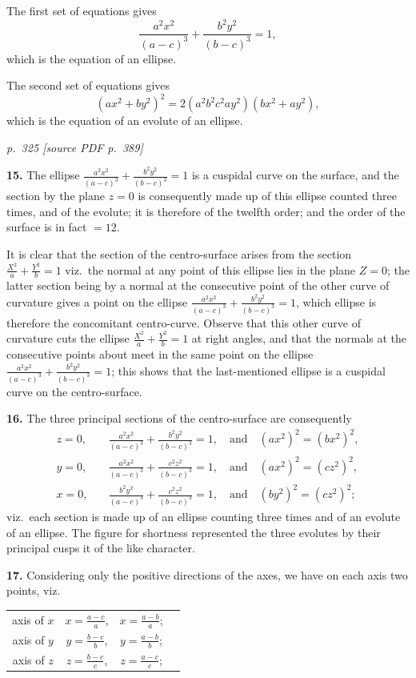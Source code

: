 \documentclass[11pt,a4paper]{article}
\newcommand{\pagemarker}[2]{\par\bigskip\noindent\textit{p.~#1 [source PDF p.~#2]}\par\smallskip}
\begin{document}
The first set of equations gives
\[
\frac{a^2 x^2}{(a - c)^3} + \frac{b^2 y^2}{(b - c)^3} = 1,
\]
which is the equation of an ellipse.

The second set of equations gives
\[
(a x^2 + b y^2)^2 = 2(a^2 b^2 c^2 a y^2)(b x^2 + a y^2),
\]
which is the equation of an evolute of an ellipse.

\clearpage

\pagemarker{325}{389}

\textbf{15.} The ellipse $\tfrac{a^2 x^2}{(a - c)^3} + \tfrac{b^2 y^2}{(b - c)^3} = 1$ is a cuspidal curve on the surface, and the section by the plane $z = 0$ is consequently made up of this ellipse counted three times, and of the evolute; it is therefore of the twelfth order; and the order of the surface is in fact $= 12$.

It is clear that the section of the centro-surface arises from the section $\tfrac{X^2}{a} + \tfrac{Y^2}{b} = 1$ viz.\ the normal at any point of this ellipse lies in the plane $Z = 0$; the latter section being by a normal at the consecutive point of the other curve of curvature gives a point on the ellipse $\tfrac{a^2 x^2}{(a - c)^3} + \tfrac{b^2 y^2}{(b - c)^3} = 1$, which ellipse is therefore the concomitant centro-curve. Observe that this other curve of curvature cuts the ellipse $\tfrac{X^2}{a} + \tfrac{Y^2}{b} = 1$ at right angles, and that the normals at the consecutive points about meet in the same point on the ellipse $\tfrac{a^2 x^2}{(a - c)^3} + \tfrac{b^2 y^2}{(b - c)^3} = 1$; this shows that the last-mentioned ellipse is a cuspidal curve on the centro-surface.

\textbf{16.} The three principal sections of the centro-surface are consequently
\begin{align*}
z = 0,\quad &\frac{a^2 x^2}{(a - c)^3} + \frac{b^2 y^2}{(b - c)^3} = 1,\quad\text{and}\quad (a x^2)^2 = (b x^2)^2,\\
y = 0,\quad &\frac{a^2 x^2}{(a - c)^3} + \frac{c^2 z^2}{(b - c)^3} = 1,\quad\text{and}\quad (a x^2)^2 = (c z^2)^2,\\
x = 0,\quad &\frac{b^2 y^2}{(a - c)^3} + \frac{c^2 z^2}{(b - c)^3} = 1,\quad\text{and}\quad (b y^2)^2 = (c z^2)^2;
\end{align*}
viz.\ each section is made up of an ellipse counting three times and of an evolute of an ellipse. The figure for shortness represented the three evolutes by their principal cusps it of the like character.

\textbf{17.} Considering only the positive directions of the axes, we have on each axis two points, viz.\
\begin{center}
\begin{tabular}{cccc}
axis of $x$ & $x = \tfrac{a - c}{a}$, & $x = \tfrac{a - b}{a}$;\\
axis of $y$ & $y = \tfrac{b - c}{b}$, & $y = \tfrac{a - b}{b}$;\\
axis of $z$ & $z = \tfrac{b - c}{c}$, & $z = \tfrac{a - c}{c}$;
\end{tabular}
\end{center}
\end{document}
